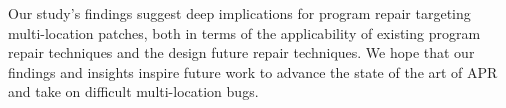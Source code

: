\documentclass[10pt, conference]{IEEEtran}
\begin{document}
Our study's findings suggest deep implications for program repair targeting
multi-location patches, both in terms of the applicability of existing program
repair techniques and the design future repair techniques.  We hope that our
findings and insights inspire future work to advance the state of the art of APR
and take on difficult multi-location bugs.



\end{document}
